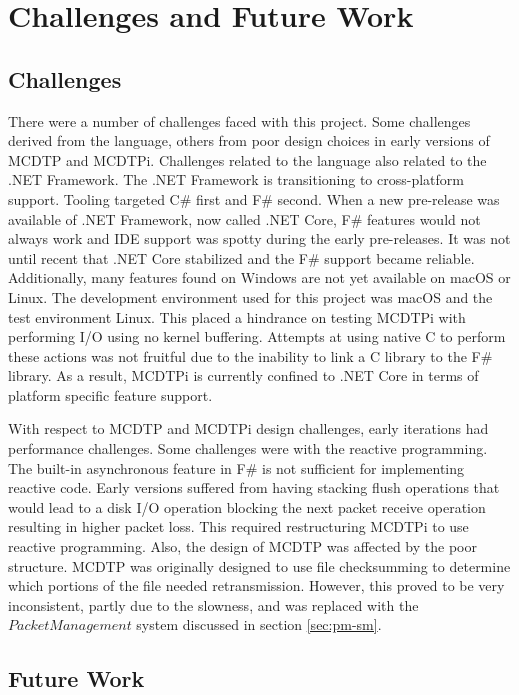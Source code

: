 \chapter{Challenges and Future Work}\label{chp:c-fw}

\section{Challenges}

There were a number of challenges faced with this project. Some challenges derived from the language, others from poor design choices in early versions of MCDTP and MCDTPi. Challenges related to the language also related to the .NET Framework. The .NET Framework is transitioning to cross-platform support. Tooling targeted C\# first and F\# second. When a new pre-release was available of .NET Framework, now called .NET Core, F\# features would not always work and IDE support was spotty during the early pre-releases. It was not until recent that .NET Core stabilized and the F\# support became reliable. Additionally, many features found on Windows are not yet available on macOS or Linux. The development environment used for this project was macOS and the test environment Linux. This placed a hindrance on testing MCDTPi with performing I/O using no kernel buffering. Attempts at using native C to perform these actions was not fruitful due to the inability to link a C library to the F\# library. As a result, MCDTPi is currently confined to .NET Core in terms of platform specific feature support.

With respect to MCDTP and MCDTPi design challenges, early iterations had performance challenges. Some challenges were with the reactive programming. The built-in asynchronous feature in F\# is not sufficient for implementing reactive code. Early versions suffered from having stacking flush operations that would lead to a disk I/O operation blocking the next packet receive operation resulting in higher packet loss. This required restructuring MCDTPi to use reactive programming. Also, the design of MCDTP was affected by the poor structure. MCDTP was originally designed to use file checksumming to determine which portions of the file needed retransmission. However, this proved to be very inconsistent, partly due to the slowness, and was replaced with the $PacketManagement$ system discussed in section \ref{sec:pm-sm}.

\section{Future Work}

